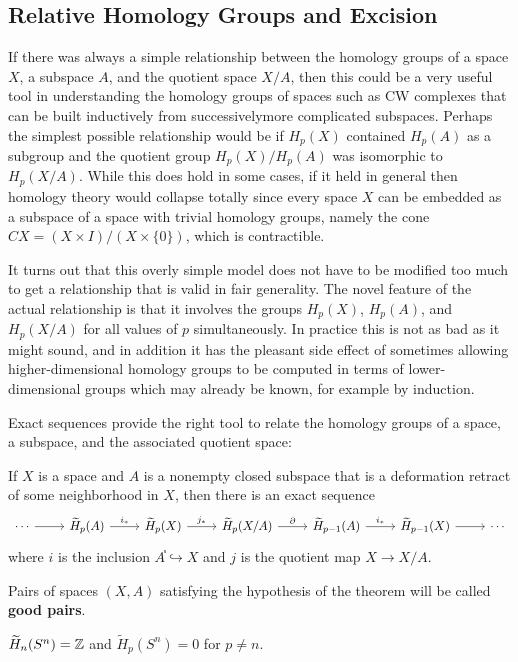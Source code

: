 \subsection{Relative Homology Groups and Excision}
If there was always a simple relationship between the homology groups of a space $X$, a subspace $A$, and the quotient space $X/A$, then this could be a very useful tool in understanding the homology groups of spaces such as CW complexes that can be built inductively from successivelymore complicated subspaces. Perhaps the simplest possible relationship would be if $H_p(X)$ contained $H_p(A)$ as a subgroup and the quotient group $H_p(X)/H_p(A)$ was isomorphic to $H_p(X/A)$. While this does hold in some cases, if it held in general then homology theory would collapse totally since every space $X$ can be embedded as a subspace of a space with trivial homology groups, namely the cone $CX=(X\times I)/(X\times\{0\})$, which is contractible.\par
It turns out that this overly simple model does not have to be modified too much to get a relationship that is valid in fair generality. The novel feature of the actual relationship is that it involves the groups $H_p(X)$, $H_p(A)$, and $H_p(X/A)$ for all values of $p$ simultaneously. In practice this is not as bad as it might sound, and in addition it has the pleasant side effect of sometimes allowing higher-dimensional homology groups to be computed in terms of lower-dimensional groups which may already be known, for example by induction.\par
Exact sequences provide the right tool to relate the homology groups of a space, a subspace, and the associated quotient space:
\begin{theorem}\label{homology quotient space}
If $X$ is a space and $A$ is a nonempty closed subspace that is a deformation retract of some neighborhood in $X$, then there is an exact sequence
\[\begin{tikzcd}
\cdots\ar[r]&\widetilde{H}_p(A)\ar[r,"i_*"]&\widetilde{H}_p(X)\ar[r,"j_*"]&\widetilde{H}_p(X/A)\ar[r,"\partial"]&\widetilde{H}_{p-1}(A)\ar[r,"i_*"]&\widetilde{H}_{p-1}(X)\ar[r]&\cdots
\end{tikzcd}\]
where $i$ is the inclusion $A֓\hookrightarrow X$ and $j$ is the quotient map $X\to X/A$.
\end{theorem}
Pairs of spaces $(X,A)$ satisfying the hypothesis of the theorem will be called \textbf{good pairs}.
\begin{corollary}
$\widetilde{H}_n(S^n)=\mathbb{Z}$ and $\widetilde{H}_p(S^n)=0$ for $p\neq n$.
\end{corollary}

